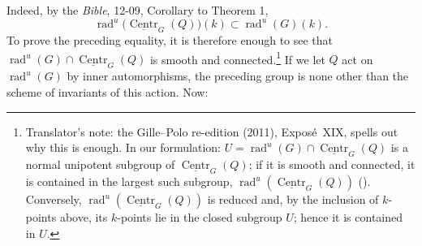 Indeed, by the \emph{Bible}, 12-09, Corollary to Theorem 1,
\[
  \operatorname{rad}^{u}\!\bigl(
    \underline{\operatorname{Centr}}_{G}(Q)\bigr)(k)
  \subset
  \operatorname{rad}^{u}(G)(k).
\]
To prove the preceding equality, it is therefore enough to see that
\(\operatorname{rad}^{u}(G)\cap\underline{\operatorname{Centr}}_{G}(Q)\)
is smooth and connected.\footnote{Translator's note: the Gille--Polo re-edition (2011), Exposé~XIX, spells out why this is
enough. In our formulation: \(U=\operatorname{rad}^{u}(G)\cap
\underline{\operatorname{Centr}}_{G}(Q)\) is a normal unipotent subgroup of
\(\underline{\operatorname{Centr}}_{G}(Q)\); if it is smooth and connected, it
is contained in the largest such subgroup,
\(\operatorname{rad}^{u}(\underline{\operatorname{Centr}}_{G}(Q))\)
(). Conversely,
\(\operatorname{rad}^{u}(\underline{\operatorname{Centr}}_{G}(Q))\) is reduced
and, by the inclusion of \(k\)-points above, its \(k\)-points lie in the
closed subgroup \(U\); hence it is contained in \(U\).}  If we let \(Q\) act on
\(\operatorname{rad}^{u}(G)\) by inner automorphisms, the preceding group
is none other than the scheme of invariants of this action.  Now:
